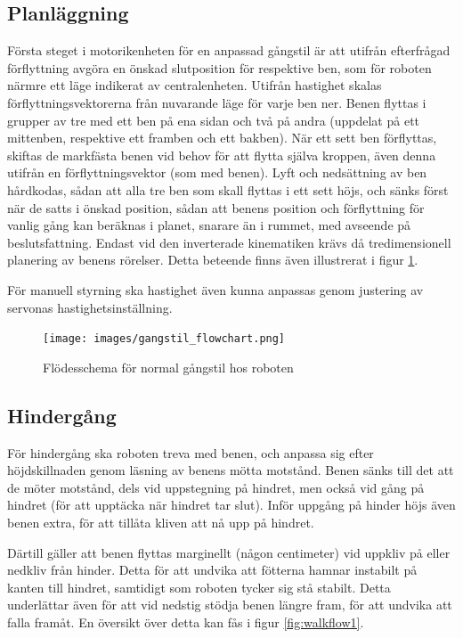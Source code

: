 \documentclass[a4paper,titlepage,12pt]{article}
\begin{document}
		\subsection{Planläggning}
	Första steget i motorikenheten för en anpassad gångstil är att utifrån efterfrågad
	förflyttning avgöra en önskad slutposition för respektive ben, som för roboten närmre 
	ett läge indikerat av centralenheten. Utifrån hastighet skalas förflyttningsvektorerna 
	från nuvarande läge för varje ben ner. Benen flyttas i grupper av tre med ett ben på 
	ena sidan och två på  andra (uppdelat på ett mittenben, respektive ett framben och ett 
	bakben). När ett sett ben förflyttas, skiftas de markfästa benen vid behov för 
	att flytta själva kroppen, även denna utifrån en förflyttningsvektor (som med benen). 
	Lyft och nedsättning av ben hårdkodas, sådan att alla tre ben som skall flyttas i ett 
	sett höjs, och sänks först när de satts i önskad position, sådan att benens position 
	och förflyttning för vanlig gång kan beräknas i planet, snarare än i rummet, med 
	avseende på beslutsfattning. Endast vid den inverterade kinematiken krävs då 
	tredimensionell planering av benens rörelser. Detta beteende finns även illustrerat i 
	figur \ref{fig:walkflow0}. 
	
	För manuell styrning ska hastighet även kunna anpassas genom justering av servonas
	hastighetsinställning.

	\begin{figure}[h]
		\centering
		\texttt{[image: images/gangstil\_flowchart.png]}
		\caption{Flödesschema för normal gångstil hos roboten \label{fig:walkflow0}}
	\end{figure}

	\subsection{Hindergång}
	För hindergång ska roboten treva med benen, och anpassa sig efter höjdskillnaden genom
	läsning av benens mötta motstånd. Benen sänks till det att de möter motstånd, dels
	vid uppstegning på hindret, men också vid gång på hindret (för att upptäcka när hindret 
	tar slut). Inför uppgång på hinder höjs även benen extra, för att tillåta kliven att nå 
	upp på hindret.

	Därtill gäller att benen flyttas marginellt (någon centimeter) vid uppkliv på eller 
	nedkliv från hinder. Detta för att undvika att fötterna hamnar instabilt på kanten till 
	hindret, samtidigt som roboten tycker sig stå stabilt. Detta underlättar även för att vid nedstig stödja benen 
	längre fram, för att undvika att falla framåt. En översikt över detta kan fås i figur \ref{fig:walkflow1}.
\end{document}

